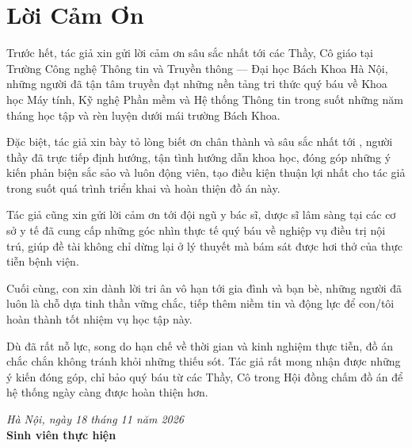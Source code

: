 \chapter*{Lời Cảm Ơn}

Trước hết, tác giả xin gửi lời cảm ơn sâu sắc nhất tới các Thầy, Cô giáo tại Trường Công nghệ Thông tin và Truyền thông --- Đại học Bách Khoa Hà Nội, những người đã tận tâm truyền đạt những nền tảng tri thức quý báu về Khoa học Máy tính, Kỹ nghệ Phần mềm và Hệ thống Thông tin trong suốt những năm tháng học tập và rèn luyện dưới mái trường Bách Khoa.

Đặc biệt, tác giả xin bày tỏ lòng biết ơn chân thành và sâu sắc nhất tới \textbf{\SupervisorName}, người thầy đã trực tiếp định hướng, tận tình hướng dẫn khoa học, đóng góp những ý kiến phản biện sắc sảo và luôn động viên, tạo điều kiện thuận lợi nhất cho tác giả trong suốt quá trình triển khai và hoàn thiện đồ án này.

Tác giả cũng xin gửi lời cảm ơn tới đội ngũ y bác sĩ, dược sĩ lâm sàng tại các cơ sở y tế đã cung cấp những góc nhìn thực tế quý báu về nghiệp vụ điều trị nội trú, giúp đề tài không chỉ dừng lại ở lý thuyết mà bám sát được hơi thở của thực tiễn bệnh viện.

Cuối cùng, con xin dành lời tri ân vô hạn tới gia đình và bạn bè, những người đã luôn là chỗ dựa tinh thần vững chắc, tiếp thêm niềm tin và động lực để con/tôi hoàn thành tốt nhiệm vụ học tập này.

Dù đã rất nỗ lực, song do hạn chế về thời gian và kinh nghiệm thực tiễn, đồ án chắc chắn không tránh khỏi những thiếu sót. Tác giả rất mong nhận được những ý kiến đóng góp, chỉ bảo quý báu từ các Thầy, Cô trong Hội đồng chấm đồ án để hệ thống ngày càng được hoàn thiện hơn.

\vspace{1.5cm}
\begin{flushright}
    \textit{Hà Nội, ngày 18 tháng 11 năm 2026}\\[0.5em]
    \textbf{Sinh viên thực hiện}\\[3.0cm]
    \textbf{\StudentName}
\end{flushright}
